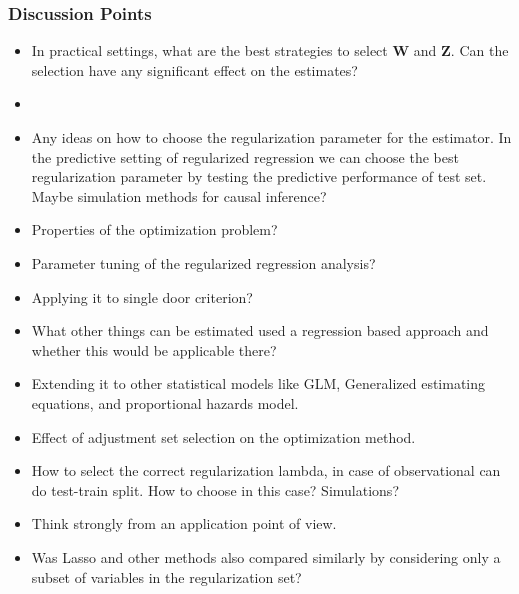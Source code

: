 \documentclass{beamer}
\begin{document}
\begin{frame}
	\frametitle{Discussion Points}
	\begin{itemize}
		\item In practical settings, what are the best strategies to select $ \bm{W} $ and $ \bm{Z} $. Can the selection have any significant effect on the estimates?
		\item
		\item Any ideas on how to choose the regularization parameter for the estimator. In the predictive setting of regularized regression we can choose the best regularization parameter by testing the predictive performance of test set. Maybe simulation methods for causal inference?
		\item Properties of the optimization problem?
		\item Parameter tuning of the regularized regression analysis?
		\item Applying it to single door criterion?
		\item What other things can be estimated used a regression based approach and whether this would be applicable there?
		\item Extending it to other statistical models like GLM, Generalized estimating equations, and proportional hazards model.
		\item Effect of adjustment set selection on the optimization method.
		\item How to select the correct regularization lambda, in case of observational can do test-train split. How to choose in this case? Simulations?
		\item Think strongly from an application point of view.
		\item Was Lasso and other methods also compared similarly by considering only a subset of variables in the regularization set?
	\end{itemize}
\end{frame}
\end{document}
